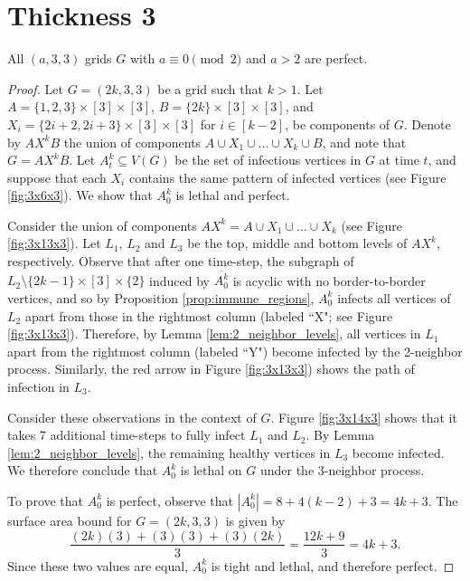 \section{Thickness 3}

\begin{con}
All $(a,3,3)$ grids $G$ with $a \equiv 0 \pmod 2$ and $a > 2$ are perfect. 
\end{con}

\begin{proof}
Let $G=(2k,3,3)$ be a grid such that $k > 1$. Let $A = \{1,2,3\} \times [3] \times [3]$, $B = \{2k\} \times [3] \times [3]$, and $X_i = \{2i+2,2i+3\} \times [3] \times [3]$ for $i \in [k-2]$, be components of $G$. Denote by $AX^kB$ the union of components $A \cup X_1 \cup \dots \cup X_{k} \cup B$, and note that $G=AX^kB$. Let $A_t^k \subseteq V(G)$ be the set of infectious vertices in $G$ at time $t$, and suppose that each $X_i$ contains the same pattern of infected vertices (see Figure \ref{fig:3x6x3}). We show that $A_0^k$ is lethal and perfect. 

Consider the union of components $AX^k = A \cup X_1 \cup \dots \cup X_{k}$ (see Figure \ref{fig:3x13x3}). Let $L_1$, $L_2$ and $L_3$ be the top, middle and bottom levels of $AX^k$, respectively. Observe that after one time-step, the subgraph of $L_2 \setminus \{2k-1\} \times [3] \times \{2\}$ induced by $\overline{A_0^k}$ is acyclic with no border-to-border vertices, and so by Proposition \ref{prop:immune_regions}, $A_0^k$ infects all vertices of $L_2$ apart from those in the rightmost column (labeled ``X"; see Figure \ref{fig:3x13x3}). Therefore, by Lemma \ref{lem:2_neighbor_levels}, all vertices in $L_1$ apart from the rightmost column (labeled ``Y") become infected by the 2-neighbor process. Similarly, the red arrow in Figure \ref{fig:3x13x3}) shows the path of infection in $L_3$. 

Consider these observations in the context of $G$. Figure \ref{fig:3x14x3} shows that it takes 7 additional time-steps to fully infect $L_1$ and $L_2$. By Lemma \ref{lem:2_neighbor_levels}, the remaining healthy vertices in $L_3$ become infected. We therefore conclude that $A_0^k$ is lethal on $G$ under the 3-neighbor process.

To prove that $A_0^k$ is perfect, observe that $|A_0^k| = 8 + 4(k-2) + 3=4k+3$. The surface area bound for $G=(2k,3,3)$ is given by
$$\frac{(2k)(3) + (3)(3) + (3)(2k)}{3} = \frac{12k + 9}{3} = 4k+3.$$
Since these two values are equal, $A_0^k$ is tight and lethal, and therefore perfect.
\end{proof}

